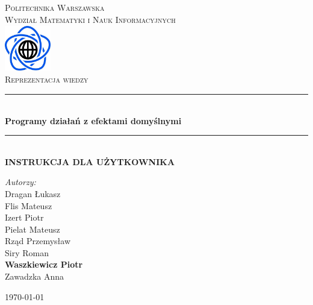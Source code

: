 \documentclass{article}
\begin{document}
	
\begin{titlepage}

\newcommand{\HRule}{\rule{\linewidth}{0.5mm}}

\begin{center}

\textsc{\LARGE Politechnika Warszawska}\\[0.5cm]
\textsc{\Large Wydział Matematyki i Nauk Informacyjnych}\\[1cm]

\includegraphics[width=2cm, height=2cm]{logo}\\[1cm]


\textsc{\Huge Reprezentacja wiedzy}\\[0.4cm]


\HRule \\[0.4cm]
{ \LARGE \bfseries Programy działań z efektami domyślnymi}\\[0.2cm]
 

\HRule \\[0.4cm]
{  \bfseries INSTRUKCJA DLA UŻYTKOWNIKA}\\[1.5cm]

\begin{flushright}
\Large \emph{Autorzy:}\\[0.5cm]
Dragan Łukasz\\
Flis Mateusz\\
Izert Piotr\\
Pielat Mateusz\\
Rząd Przemysław\\
Siry Roman\\
\textbf{Waszkiewicz Piotr}\\
Zawadzka Anna\\[0.9cm]

\end{flushright}

\vfill
{\large \today}\\[1cm]
	
\end{center}

\end{titlepage}
\end{document}
